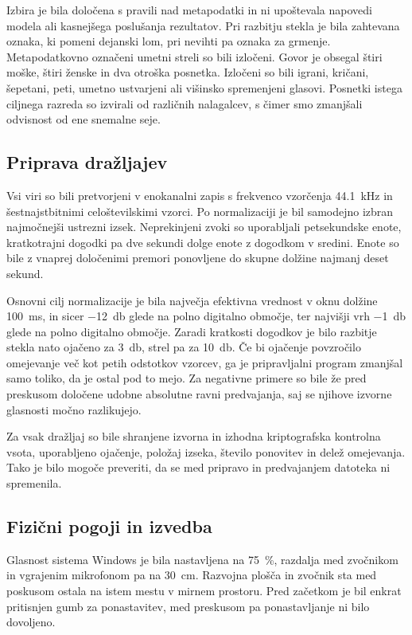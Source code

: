 Izbira je bila določena s pravili nad metapodatki in ni upoštevala napovedi
modela ali kasnejšega poslušanja rezultatov. Pri razbitju stekla je bila
zahtevana oznaka, ki pomeni dejanski lom, pri nevihti pa oznaka za grmenje.
Metapodatkovno označeni umetni streli so bili izločeni. Govor je obsegal štiri
moške, štiri ženske in dva otroška posnetka. Izločeni so bili igrani, kričani,
šepetani, peti, umetno ustvarjeni ali višinsko spremenjeni glasovi. Posnetki
istega ciljnega razreda so izvirali od različnih nalagalcev, s čimer smo
zmanjšali odvisnost od ene snemalne seje.

\subsection{Priprava dražljajev}

Vsi viri so bili pretvorjeni v enokanalni zapis s frekvenco vzorčenja
\SI{44.1}{\kilo\hertz} in šestnajstbitnimi celoštevilskimi vzorci. Po
normalizaciji je bil samodejno izbran najmočnejši ustrezni izsek. Neprekinjeni
zvoki so uporabljali petsekundske enote, kratkotrajni dogodki pa dve sekundi
dolge enote z dogodkom v sredini. Enote so bile z vnaprej določenimi premori
ponovljene do skupne dolžine najmanj deset sekund.

Osnovni cilj normalizacije je bila največja efektivna vrednost v oknu dolžine
\SI{100}{\milli\second}, in sicer \SI{-12}{\decibel} glede na polno digitalno območje, ter najvišji vrh
\SI{-1}{\decibel} glede na polno digitalno območje. Zaradi kratkosti dogodkov
je bilo razbitje stekla nato ojačeno za \SI{3}{\decibel}, strel pa za
\SI{10}{\decibel}. Če bi ojačenje povzročilo omejevanje več kot petih odstotkov
vzorcev, ga je pripravljalni program zmanjšal samo toliko, da je ostal pod to
mejo. Za negativne primere so bile že pred preskusom določene udobne absolutne
ravni predvajanja, saj se njihove izvorne glasnosti močno razlikujejo.

Za vsak dražljaj so bile shranjene izvorna in izhodna kriptografska kontrolna
vsota, uporabljeno ojačenje, položaj izseka, število ponovitev in delež
omejevanja. Tako je bilo mogoče preveriti, da se med pripravo in predvajanjem
datoteka ni spremenila.

\subsection{Fizični pogoji in izvedba}

Glasnost sistema Windows je bila nastavljena na \SI{75}{\percent}, razdalja med
zvočnikom in vgrajenim mikrofonom pa na \SI{30}{\centi\meter}. Razvojna plošča
in zvočnik sta med poskusom ostala na istem mestu v mirnem prostoru. Pred
začetkom je bil enkrat pritisnjen gumb za ponastavitev, med preskusom pa
ponastavljanje ni bilo dovoljeno.

